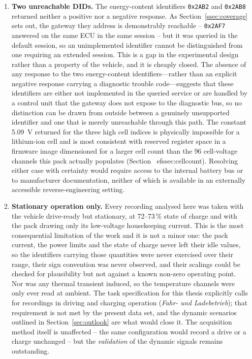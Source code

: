 \documentclass[11pt,a4paper,oneside,parskip=half]{scrreprt}
\providecommand{\hex}{}\renewcommand{\hex}[1]{\texttt{0x#1}}
\begin{document}
\begin{enumerate}
  \item \textbf{Two unreachable DIDs.} The energy-content identifiers \hex{2AB2} and \hex{2AB8} returned neither a positive nor a negative response. As Section~\ref{ssec:coverage} sets out, the gateway they address is demonstrably reachable -- \hex{2AF7} answered on the same ECU in the same session -- but it was queried in the default session, so an unimplemented identifier cannot be distinguished from one requiring an extended session. This is a gap in the experimental design rather than a property of the vehicle, and it is cheaply closed. The absence of any response to the two energy-content identifiers---rather than an explicit negative response carrying a diagnostic trouble code---suggests that these identifiers are either not implemented in the queried service or are handled by a control unit that the gateway does not expose to the diagnostic bus, so no distinction can be drawn from outside between a genuinely unsupported identifier and one that is merely unreachable through this path. The constant 5.09~V returned for the three high cell indices is physically impossible for a lithium-ion cell and is most consistent with reserved register space in a firmware image dimensioned for a larger cell count than the 96 cell-voltage channels this pack actually populates (Section~
ef{ssec:cellcount}). Resolving either case with certainty would require access to the internal battery bus or to manufacturer documentation, neither of which is available in an externally accessible reverse-engineering setting.
  \item \textbf{Stationary operation only.} Every recording analysed here was taken with the vehicle drive-ready but stationary, at 72--73\,\% state of charge and with the pack drawing only its low-voltage housekeeping current. This is the most consequential limitation of the work and it is not a minor one: the pack current, the power limits and the state of charge never left their idle values, so the identifiers carrying those quantities were never exercised over their range, their sign convention was never observed, and their scalings could be checked for plausibility but not against a known non-zero operating point. Nor was any thermal transient induced, so the temperature channels were only ever read at ambient. The task specification for this thesis explicitly calls for recordings in driving and charging operation (\emph{Fahr- und Ladebetrieb}); that requirement is not met by the present data set, and the dynamic scenarios outlined in Section~\ref{sec:outlook} are what would close it. The acquisition method itself is unaffected -- the same configuration would record a drive or a charge unchanged -- but the \emph{validation} of the dynamic signals remains outstanding.

\end{enumerate}
\end{document}
